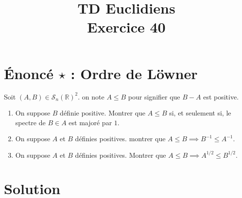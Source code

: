 \documentclass[french]{article}
\title{TD Euclidiens\\ Exercice 40}
\date{}
\newcommand{\R}{\mathbb{R}}
\newcommand{\inv}{^{-1}}
\begin{document}
\maketitle

\section{Énoncé $\star$ : Ordre de Löwner}
Soit $(A,B)\in\mathcal{S}_n(\R)^2$. on note $A\leqslant B$ pour signifier que $B-A$ est positive.
\begin{enumerate}
	\item On suppose $B$ définie positive. Montrer que $A\leqslant B$ si, et seulement si, le spectre de $B\in A$ est majoré par $1$.
	\item On suppose $A$ et $B$ définies positives. montrer que $A\leqslant B\implies B\inv\leqslant A\inv$.
	\item On suppose $A$ et $B$ définies positives. Montrer que $A\leqslant B\implies A^{1/2}\leqslant B^{1/2}$.
\end{enumerate}
\section{Solution}
\end{document}
